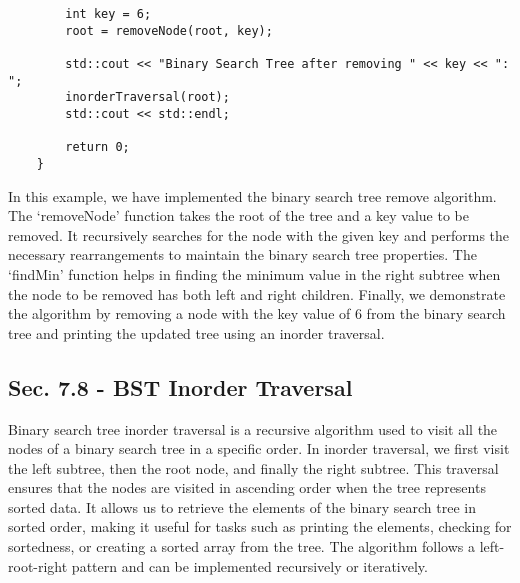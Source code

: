 \begin{solution}
\begin{verbatim}
        int key = 6;
        root = removeNode(root, key);
    
        std::cout << "Binary Search Tree after removing " << key << ": ";
        inorderTraversal(root);
        std::cout << std::endl;
    
        return 0;
    }
    \end{verbatim}

    \horizontalline
    
    In this example, we have implemented the binary search tree remove algorithm. The `removeNode' function takes the root of the tree and a key value to be removed. It recursively searches for the node with the given key and performs the necessary rearrangements to maintain the binary search tree properties. The `findMin' function 
    helps in finding the minimum value in the right subtree when the node to be removed has both left and right children. Finally, we demonstrate the algorithm by removing a node with the key value of 6 from the binary search tree and printing the updated tree using an inorder traversal.
\end{solution}

\subsection*{Sec. 7.8 - BST Inorder Traversal}

Binary search tree inorder traversal is a recursive algorithm used to visit all the nodes of a binary search tree in a specific order. In inorder traversal, we first visit the left subtree, then the root node, and finally the right subtree. This traversal ensures that the nodes are visited in ascending order when the tree represents sorted 
data. It allows us to retrieve the elements of the binary search tree in sorted order, making it useful for tasks such as printing the elements, checking for sortedness, or creating a sorted array from the tree. The algorithm follows a left-root-right pattern and can be implemented recursively or iteratively.

